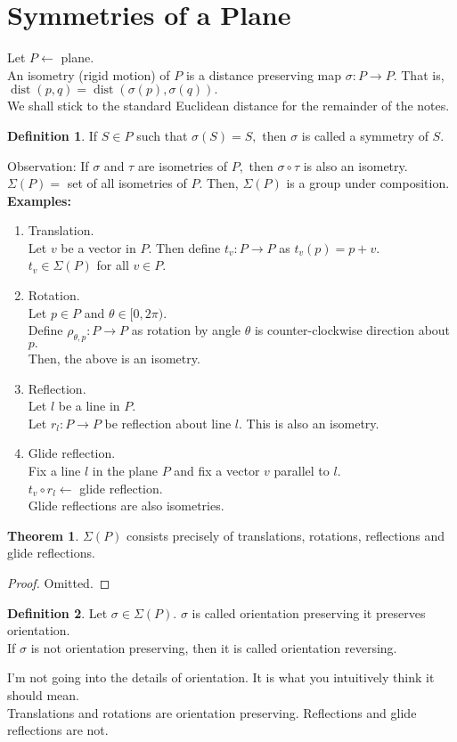 \documentclass[12 pt, a4paper, toc=graduated, oneside]{article}
\theoremstyle{definition}
\newtheorem{defn}{Definition}
\newtheorem{theorem}{Theorem}
\begin{document}
\section{Symmetries of a Plane}
Let $P \longleftarrow$ plane.\\
An isometry (rigid motion) of $P$ is a distance preserving map $\sigma : P \to P.$ That is, $\operatorname{dist}(p, q) = \operatorname{dist}(\sigma(p), \sigma(q)).$\\
We shall stick to the standard Euclidean distance for the remainder of the notes.\\
\begin{defn}
	If $S \in P$ such that $\sigma(S) = S,$ then $\sigma$ is called a symmetry of $S.$
\end{defn}
Observation: If $\sigma$ and $\tau$ are isometries of $P,$ then $\sigma \circ \tau$ is also an isometry.\\
$\Sigma(P) = $ set of all isometries of $P.$ Then, $\Sigma(P)$ is a group under composition.\\
\textbf{Examples:}
\begin{enumerate}[nosep] 
 	\item Translation.\\
 	Let $v$ be a vector in $P.$ Then define $t_v : P \to P$ as $t_v(p) = p + v.$\\
 	$t_v \in \Sigma(P)$ for all $v \in P.$
 	\item Rotation.\\
 	Let $p \in P$ and $\theta \in [0, 2\pi).$\\
 	Define $\rho_{\theta, p}:P \to P$ as rotation by angle $\theta$ is counter-clockwise direction about $p.$\\
 	Then, the above is an isometry.
 	\item Reflection.\\
 	Let $l$ be a line in $P.$\\
 	Let $r_l : P\to P$ be reflection about line $l.$ This is also an isometry.
 	\item Glide reflection.\\
 	Fix a line $l$ in the plane $P$ and fix a vector $v$ parallel to $l.$\\
 	$t_v \circ r_l \longleftarrow$ glide reflection.\\
 	Glide reflections are also isometries.
 \end{enumerate} 
\begin{theorem}
	$\Sigma(P)$ consists precisely of translations, rotations, reflections and glide reflections.
\end{theorem}
\begin{proof}
	Omitted.
\end{proof}
\begin{defn}
	Let $\sigma \in \Sigma(P).$ $\sigma$ is called orientation preserving it preserves orientation.\\
	If $\sigma$ is not orientation preserving, then it is called orientation reversing.
\end{defn}
I'm not going into the details of orientation. It is what you intuitively think it should mean.\\
Translations and rotations are orientation preserving. Reflections and glide reflections are not.
\end{document}
